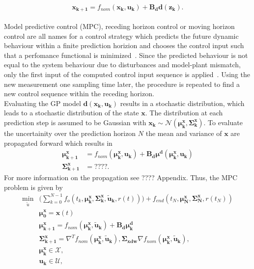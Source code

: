 \documentclass[letterpaper, 10 pt, conference]{ieeeconf}  %
\begin{document}
\begin{equation}
\boldsymbol{x_{k+1}} = f_{nom}(\boldsymbol{x_k},\boldsymbol{u_k}) + \boldsymbol{B_d} \boldsymbol{d}(\boldsymbol{z_k}).
\end{equation}
 \\
Model predictive control (MPC), receding  horizon  control or moving horizon control are all names for a control strategy which predicts the future dynamic behaviour within a finite prediction horizion and chooses the control input such that a perfomance functional is minimized~\cite{allgeowernonlinear}. Since the predicted behaviour is not equal to the system behaviour due to disturbances and model-plant mismatch, only the first input of the computed control input sequence is applied~\cite{allgeowernonlinear}. Using the new measurement one sampling time later, the procedure is repeated to find a new control sequence within the receding horizon.\\
Evaluating the GP model $\boldsymbol{d}(\boldsymbol{x_k},\boldsymbol{u_k})$ results in a stochastic distribution, which leads to a stochastic distribution of the state $\boldsymbol{x}$. The distribution at each prediction step is assumed to be Gaussian with $\boldsymbol{x_k} \sim \mathcal{N}(\boldsymbol{\mu^x_k},\boldsymbol{\Sigma^x_k})$. To evaluate the uncertainity over the prediction horizon $N$ the mean and variance of $\boldsymbol{x}$ are propagated forward which results in
\begin{align}
\boldsymbol{\mu^x_{k+1}}&= f_{nom}(\boldsymbol{\mu^x_k},\boldsymbol{u_k})+\boldsymbol{B_d} \boldsymbol{\mu^d}(\boldsymbol{\mu^x_k},\boldsymbol{u_k})\\
\boldsymbol{\Sigma^x_{k+1}} &= ????.
\end{align}
For more information on the propagation see ???? Appendix.
Thus, the MPC problem is given by
\begin{align}
\min_{\tilde{u}} &\big(\sum_{k=0}^{N-1} f_o(t_k,\boldsymbol{\mu^x_k},\boldsymbol{\Sigma^x_k},\boldsymbol{\tilde{u}_k},r(t))\big) + f_{end}(t_N,\boldsymbol{\mu^x_N},\boldsymbol{\Sigma^x_N},r(t_N))\\
&\boldsymbol{\mu^x_0} = \boldsymbol{x}(t)\\
&\boldsymbol{\mu^x_{k+1}}= f_{nom}(\boldsymbol{\mu^x_k},\boldsymbol{\tilde{u}_k})+\boldsymbol{B_d} \boldsymbol{\mu^d_k}\\
&\boldsymbol{\Sigma^x_{k+1}}=\nabla^T  f_{nom}(\boldsymbol{\mu^x_k},\boldsymbol{\tilde{u}_k}),\boldsymbol{\Sigma_{xdw}} \nabla f_{nom}(\boldsymbol{\mu^x_k},\boldsymbol{\tilde{u}_k}),\\
&\boldsymbol{\mu^x_k} \in \mathcal{X},\\
&\boldsymbol{u_k} \in \mathcal{U},
\end{align}
\end{document}

